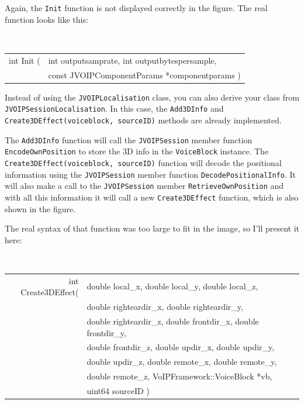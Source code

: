 			Again, the {\tt Init} function is not displayed correctly in the figure.
			The real function looks like this:
			\begin{center}
				{\tt
				\begin{tabular}{rl}
					int Init (&int outputsamprate, int outputbytespersample,\\
					&const JVOIPComponentParams *componentparams )\\
				\end{tabular}
				}
			\end{center}
			
			Instead of using the {\tt JVOIPLocalisation} class, you can also derive
			your class from {\tt JVOIPSessionLocalisation}. In this case, the
			{\tt Add3DInfo} and {\tt Create\-3D\-Effect\-(voice\-block, source\-ID)} methods are
			already implemented.
			
			The {\tt Add3DInfo} function will call the {\tt JVOIPSession} member function
			{\tt Encode\-Own\-Position} to store the 3D info in the {\tt VoiceBlock} instance.
			The {\tt Create\-3D\-Effect\-(voice\-block, source\-ID)} function will decode the positional
			information using the {\tt JVOIP\-Session} member function {\tt DecodePositionalInfo}.
			It will also make a call to the {\tt JVOIP\-Session} member {\tt RetrieveOwnPosition}
			and with all this information it will call a new {\tt Create\-3D\-Effect} function,
			which is also shown in the figure.
			
			The real syntax of that function was too large to fit in the image, so I'll
			present it here:
			\begin{center}
				{\tt
				\begin{tabular}{rl}
				int Create3DEffect(&double local\_x, double local\_y, double local\_z,\\
				                   &double righteardir\_x, double righteardir\_y, \\
						   &double righteardir\_z, double frontdir\_x, double frontdir\_y, \\
						   &double frontdir\_z, double updir\_x, double updir\_y, \\
						   &double updir\_z, double remote\_x, double remote\_y,\\
						   &double remote\_z, VoIPFramework::VoiceBlock *vb,\\
			                           &uint64 sourceID )\\
				\end{tabular}
				}
			\end{center}
			
